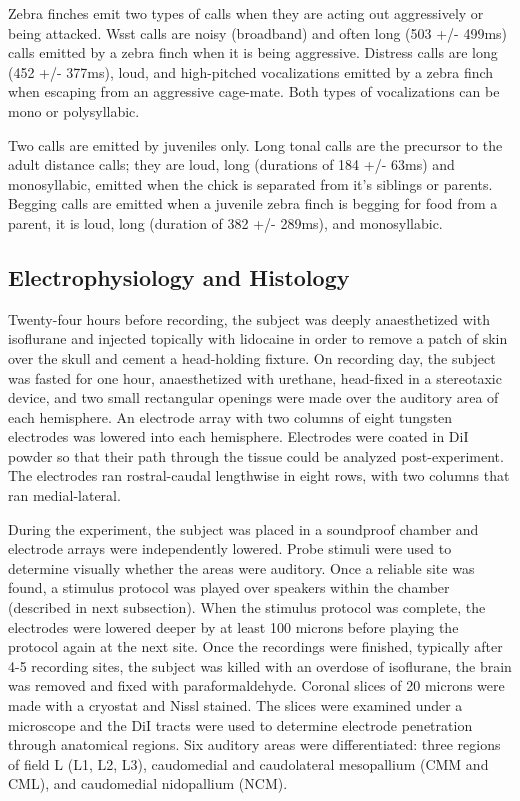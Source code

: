 Zebra finches emit two types of calls when they are acting out aggressively or being attacked. Wsst calls are noisy (broadband) and often long (503 +/- 499ms) calls emitted by a zebra finch when it is being aggressive. Distress calls are long (452 +/- 377ms), loud, and high-pitched vocalizations emitted by a zebra finch when escaping from an aggressive cage-mate. Both types of vocalizations can be mono or polysyllabic.

Two calls are emitted by juveniles only. Long tonal calls are the precursor to the adult distance calls; they are loud, long (durations of 184 +/- 63ms) and monosyllabic, emitted when the chick is separated from it’s siblings or parents. Begging calls are emitted when a juvenile zebra finch is begging for food from a parent, it is loud, long (duration of 382 +/- 289ms), and monosyllabic.

\subsection{Electrophysiology and Histology}

    Twenty-four hours before recording, the subject was deeply anaesthetized with isoflurane and injected topically with lidocaine in order to remove a patch of skin over the skull and cement a  head-holding fixture. On recording day, the subject was fasted for one hour, anaesthetized with urethane, head-fixed in a stereotaxic device, and two small rectangular openings were made over the auditory area of each hemisphere. An electrode array with two columns of eight tungsten electrodes was lowered into each hemisphere. Electrodes were coated in DiI powder so that their path through the tissue could be analyzed post-experiment. The electrodes ran rostral-caudal lengthwise in eight rows, with two columns that ran medial-lateral.

    During the experiment, the subject was placed in a soundproof chamber and electrode arrays were independently lowered. Probe stimuli were used to determine visually whether the areas were auditory. Once a reliable site was found, a stimulus protocol was played over speakers within the chamber (described in next subsection). When the stimulus protocol was complete, the electrodes were lowered deeper by at least 100 microns before playing the protocol again at the next site.
Once the recordings were finished, typically after 4-5 recording sites, the subject was killed with an overdose of isoflurane, the brain was removed and fixed with paraformaldehyde. Coronal slices of 20 microns were made with a cryostat and Nissl stained. The slices were examined under a microscope and the DiI tracts were used to determine electrode penetration through anatomical regions. Six auditory areas were differentiated: three regions of field L (L1, L2, L3), caudomedial and caudolateral mesopallium (CMM and CML), and caudomedial nidopallium (NCM).

